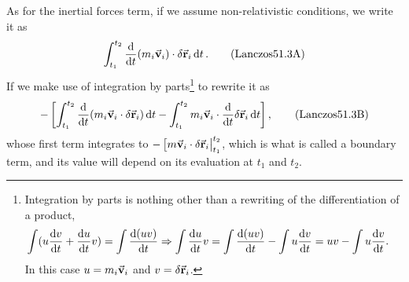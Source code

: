 \documentclass[12pt, spanish, a4paper, ]{article}
\begin{document}
As for the inertial forces term, if we assume non-relativistic conditions, we write it as 
\begin{equation}\label{Lanczos51.3A}
	\int^{t_2}_{t_1} \dv{t} \pqty{m_i \va{v}_i} \cdot \delta \va{r}_i \dd{t}.
	\tag{Lanczos51.3A}
\end{equation} 
If we make use of integration by parts\footnote{\label{integraciónPartes}Integration by parts is nothing other than a rewriting of the differentiation of a product, 
\begin{align}
	\int (u \dv{v}{t}+ \dv{u}{t} v) & = \int \dv{(u v)}{t} \Rightarrow
	\int \dv{u}{t} v = \int \dv{(u v)}{t} - \int u \dv{v}{t}
	=
	u v - \int u \dv{v}{t}
	.
\end{align}
In this case \(u= m_i \va{v}_i\) and \(v= \delta \va{r}_i\).
} to rewrite it as
\begin{equation}\label{Lanczos51.3B}
- \left[ \int^{t_2}_{t_1} \dv{t} \pqty{ m_i \va{v}_i  \cdot \delta \va{r}_i } \dd{t} - \int^{t_2}_{t_1} m_i \va{v}_i \cdot \dv{t} \delta \va{r}_i \dd{t} \right],
	\tag{Lanczos51.3B}
\end{equation}
whose first term integrates to \(- \eval[ m \va{v}_i \cdot \delta \va{r}_i |^{t_2}_{t_1}\), which is what is called a boundary term, and its value will depend on its evaluation at \(t_1\) and \(t_2\).
\end{document}
